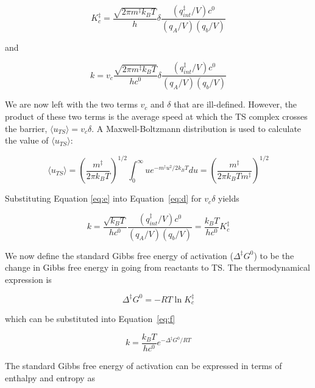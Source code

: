 \begin{doublespace}
\begin{equation}
  K_c^{\ddagger} =  \frac{\sqrt{2\pi m^\ddagger k_B T}}{h}\delta\frac{(q_{int}^\ddagger/V)c^0}{(q_A/V)(q_b/V)}
\end{equation}

\noindent and

\begin{equation}
 k = v_c \frac{\sqrt{2\pi m^\ddagger
     k_B T}}{hc^0}\delta\frac{(q_{int}^\ddagger/V)c^0}{(q_A/V)(q_b/V)}
\label{eq:d}
\end{equation}

We are now left with the two terms $v_c$ and $\delta$ that are ill-defined.
However, the product of these two terms is the average speed at which the TS
complex crosses the barrier, $\langle u_{TS} \rangle = v_c\delta$. A
Maxwell-Boltzmann distribution is used to calculate the value of $\langle
u_{TS} \rangle$:

\begin{equation}
  \langle u_{TS} \rangle = \left( \frac{m^\ddagger}{2\pi k_B T} \right)^{1/2}
  \int_0^\infty u e^{-m^\ddagger u^2/2k_B T}du = \left( \frac{m^\ddagger}{2\pi
      k_B T m^\ddagger} \right)^{1/2}
\label{eq:e}
\end{equation}

\noindent Substituting Equation \ref{eq:e} into Equation~\ref{eq:d} for
$v_c\delta$ yields

\begin{equation}
  k =
  \frac{\sqrt{k_B T}}{hc^0}\frac{(q_{int}^\ddagger/V)c^0}{(q_A/V)(q_b/V)} = \frac{k_B T}{hc^0}K_c^\ddagger
\label{eq:f}
\end{equation}

We now define the standard Gibbs free energy of activation ($\Delta ^\ddagger
G^0$) to be the change in Gibbs free energy in going from reactants to TS.\@
The thermodynamical expression is

\begin{equation}
  \Delta ^\ddagger G^0 = -RT \ln K_c^\ddagger
\end{equation}

\noindent which can be substituted into Equation~\ref{eq:f}

\begin{equation}
  k = \frac{k_B T}{hc^0} e^{-\Delta^\ddagger G^0/RT}
\label{eq:g}
\end{equation}

The standard Gibbs free energy of activation can be expressed in terms of
enthalpy and entropy as


\end{doublespace}
